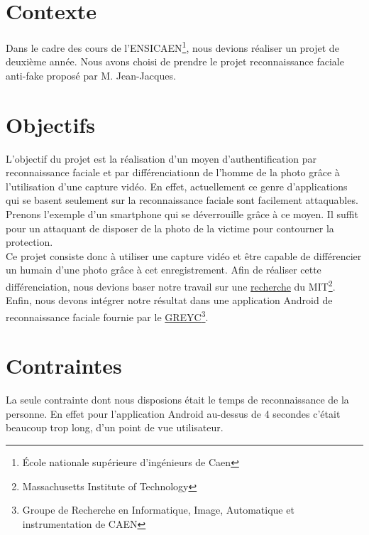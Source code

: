 \section{Contexte}

Dans le cadre des cours de l'ENSICAEN\footnote{École nationale supérieure d'ingénieurs de Caen}, nous devions réaliser un projet de deuxième année. Nous avons choisi de prendre le projet reconnaissance faciale anti-fake proposé
par M.  Jean-Jacques.

\section{Objectifs}

L'objectif du projet est la réalisation d'un moyen d'authentification par reconnaissance faciale et par différenciationn de l'homme de la photo  grâce à l'utilisation d'une capture vidéo. En effet, actuellement ce genre d'applications qui se basent seulement sur la reconnaissance faciale sont facilement
attaquables. Prenons l'exemple d'un smartphone qui se déverrouille grâce à ce moyen. Il suffit pour un attaquant de disposer de la photo de la victime pour contourner la protection. \\
Ce projet consiste donc à utiliser une capture vidéo et être capable de différencier un humain d'une photo grâce à cet enregistrement. Afin de réaliser cette différenciation, nous devions baser notre travail sur une \href{http://people.csail.mit.edu/mrub/papers/vidmag.pdf}{recherche} du MIT\footnote{Massachusetts Institute of Technology}\@. Enfin, nous devons intégrer notre résultat dans une application Android de reconnaissance faciale fournie par le \href{https://www.greyc.fr/}{GREYC\footnote{Groupe de Recherche en Informatique, Image, Automatique et instrumentation de CAEN}}.

\section{Contraintes}

La seule contrainte dont nous disposions était le temps de reconnaissance de la personne. En effet pour l'application Android au-dessus de 4 secondes c'était beaucoup trop long, d'un point de vue
utilisateur.
